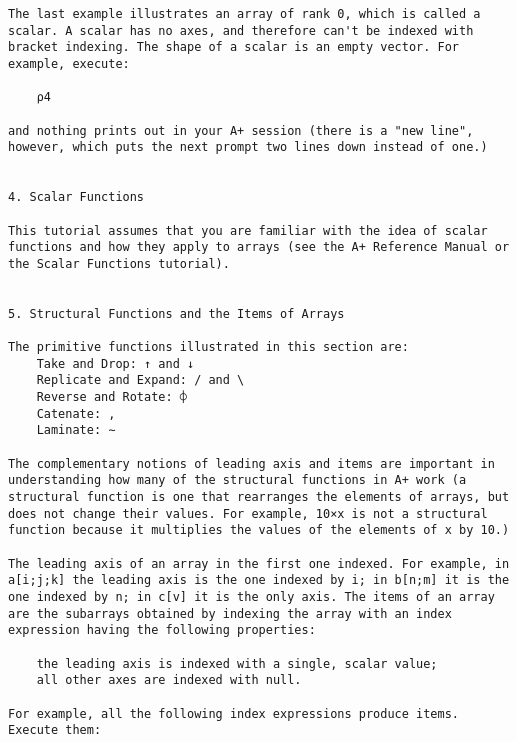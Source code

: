 \documentclass{article}
\begin{document}
\begin{verbatim}
The last example illustrates an array of rank 0, which is called a    
scalar. A scalar has no axes, and therefore can't be indexed with     
bracket indexing. The shape of a scalar is an empty vector. For       
example, execute:                                                     

	⍴4                                                                   

and nothing prints out in your A+ session (there is a "new line",     
however, which puts the next prompt two lines down instead of one.)  	


4. Scalar Functions                                                   

This tutorial assumes that you are familiar with the idea of scalar   
functions and how they apply to arrays (see the A+ Reference Manual or
the Scalar Functions tutorial).                                       


5. Structural Functions and the Items of Arrays                       

The primitive functions illustrated in this section are:              
	Take and Drop: ↑ and ↓                                                
	Replicate and Expand: / and \                                         
	Reverse and Rotate: ⌽                                                 
	Catenate: ,                                                           
	Laminate: ∼                                                           

The complementary notions of leading axis and items are important in  
understanding how many of the structural functions in A+ work (a      
structural function is one that rearranges the elements of arrays, but
does not change their values. For example, 10×x is not a structural   
function because it multiplies the values of the elements of x by 10.)

The leading axis of an array in the first one indexed. For example, in
a[i;j;k] the leading axis is the one indexed by i; in b[n;m] it is the
one indexed by n; in c[v] it is the only axis. The items of an array  
are the subarrays obtained by indexing the array with an index        
expression having the following properties:                           

    the leading axis is indexed with a single, scalar value;          
    all other axes are indexed with null.                             

For example, all the following index expressions produce items.       
Execute them:                                                         


\end{verbatim}
\end{document}
